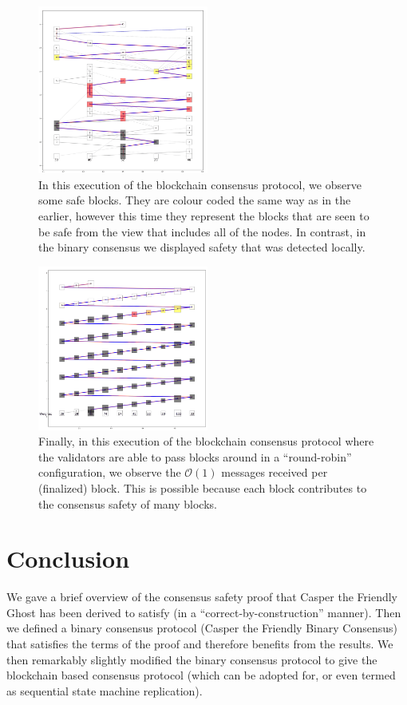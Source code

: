 \documentclass{article}
\theoremstyle{definition}
\begin{document}
\begin{figure}[h!]
\centering
\includegraphics[width=0.5\textwidth]{blockchainsafety}
\caption{In this execution of the blockchain consensus protocol, we observe some safe blocks. They are colour coded the same way as in the earlier, however this time they represent the blocks that are seen to be safe from the view that includes all of the nodes. In contrast, in the binary consensus we displayed safety that was detected locally.}
\end{figure}


\begin{figure}[h!]
\centering
\includegraphics[width=0.5\textwidth]{roundrobin}
\caption{Finally, in this execution of the blockchain consensus protocol where the validators are able to pass blocks around in a ``round-robin'' configuration, we observe the $\mathcal{O}(1)$ messages received per (finalized) block. This is possible because each block contributes to the consensus safety of many blocks.}
\end{figure}

\section{Conclusion}

We gave a brief overview of the consensus safety proof that Casper the Friendly Ghost has been derived to satisfy (in a ``correct-by-construction'' manner). Then we defined a binary consensus protocol (Casper the Friendly Binary Consensus) that satisfies the terms of the proof and therefore benefits from the results. We then remarkably slightly modified the binary consensus protocol to give the blockchain based consensus protocol (which can be adopted for, or even termed as sequential state machine replication).
\end{document}
